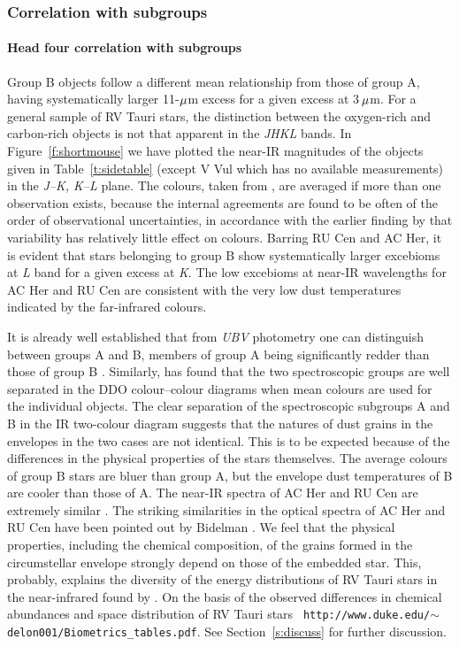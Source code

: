 \documentclass[useAMS,usenatbib, referree]{biom}
\begin{document}
\subsubsection{Correlation with subgroups}%
\paragraph{Head four correlation with subgroups}%
Group B objects follow a different mean relationship from those of
group A, having systematically larger 11-$\mu$m excess for a given
excess at 3$\,\mu$m. For a general sample of RV Tauri stars, the
distinction between the oxygen-rich and carbon-rich objects is not
that apparent in the {\it JHKL\/} bands. In Figure~\ref{f:shortmouse}
we have plotted the near-IR magnitudes of the objects given in
Table~\ref{t:sidetable} (except V Vul which has no available
measurements) in the {\it J--K, K--L\/} plane. The colours, taken from
\citet{b9}, are averaged if more than one observation exists, because
the internal agreements are found to be often of the order of
observational uncertainties, in accordance with the earlier finding by
\citet{b5} that variability has relatively little effect on
colours. Barring RU Cen and AC Her, it is evident that stars belonging
to group B show systematically larger excebioms at {\it L\/} band for
a given excess at {\it K}. The low excebioms at near-IR wavelengths
for AC Her and RU Cen are consistent with the very low dust
temperatures indicated by the far-infrared colours.
%

It is already well established that from {\it UBV\/} photometry one
can distinguish between groups A and B, members of group A being
significantly redder than those of group B \citep{b20}.  Similarly,
\citet{b4} has found that the two spectroscopic groups are well
separated in the DDO colour--colour diagrams when mean colours are
used for the individual objects. The clear separation of the
spectroscopic subgroups A and B in the IR two-colour diagram suggests
that the natures of dust grains in the envelopes in the two cases are
not identical. This is to be expected because of the differences in
the physical properties of the stars themselves. The average colours
of group B stars are bluer than group A, but the envelope dust
temperatures of B are cooler than those of A. The near-IR spectra of
AC Her and RU Cen are extremely similar \citep{b6}. The striking
similarities in the optical spectra of AC Her and RU Cen have been
pointed out by Bidelman \citep{b18}. We feel that the physical
properties, including the chemical composition, of the grains formed
in the circumstellar envelope strongly depend on those of the embedded
star. This, probably, explains the diversity of the energy
distributions of RV Tauri stars in the near-infrared found by
\citet{b6}. On the basis of the observed differences in chemical
abundances and space distribution of RV Tauri stars {\tt
http://www.duke.edu/$\sim$delon001/Biometrics\_tables.pdf}.  See
Section~\ref{s:discuss} for further discussion.
\end{document}
